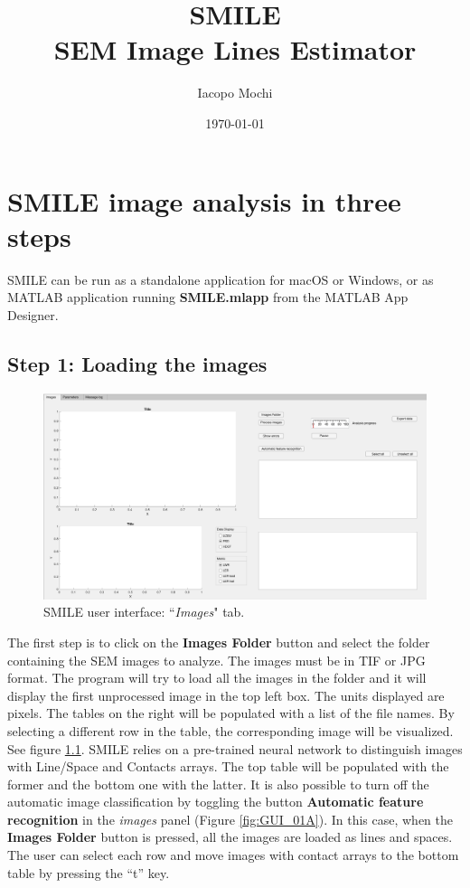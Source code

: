 \documentclass[12pt, a4paper, openany]{report}
\begin{document}
\title{SMILE\\
SEM Image Lines Estimator}
\author{Iacopo Mochi}
\date{\today}

\maketitle


\chapter{SMILE image analysis in three steps}
SMILE can  be run as a standalone application for macOS or Windows, or as MATLAB application running \textbf{SMILE.mlapp} from the MATLAB App Designer.
\section{Step 1: Loading the images}
\begin{figure}[hbtp]
	\includegraphics[width=\textwidth]{figures/GUI_01.png}
	\caption{SMILE user interface: ``\emph{Images}" tab.}
	\label{fig:GUI_01}
\end{figure}
The first step is to click on the \textbf{Images Folder} button and select the folder containing the SEM images to analyze. The images must be in TIF or JPG format. The program will try to load all the images in the folder and it will display the first unprocessed image in the top left box. The units displayed are pixels. The tables on the right will be populated with a list of the file names. By selecting a different row in the table, the corresponding image will be visualized. See figure \ref{fig:GUI_01}. SMILE relies on a pre-trained neural network to distinguish images with Line/Space and Contacts arrays. The top table will be populated with the former and the bottom one with the latter. It is also possible to turn off the automatic image classification by toggling the button \textbf{Automatic feature recognition} in the \emph{images} panel (Figure \ref{fig:GUI_01A}). In this case, when the \textbf{Images Folder} button is pressed, all the images are loaded as lines and spaces. The user can select each row and move images with contact arrays to the bottom table by pressing the ``t'' key. 
\end{document}
